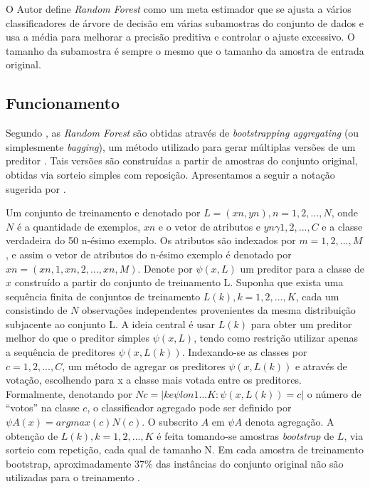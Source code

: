 O Autor \cite{scikitlearn} define \textit{Random Forest} como um meta estimador que se ajusta a vários classificadores de árvore de decisão em várias subamostras do conjunto de dados e usa a média para melhorar a precisão preditiva e controlar o ajuste excessivo. O tamanho da subamostra é sempre o mesmo que o tamanho da amostra de entrada original.

\subsection{Funcionamento}

Segundo \cite{bastos2013proposta}, as \textit{Random Forest} são obtidas através de \textit{bootstrapping aggregating} (ou simplesmente \textit{bagging}), um método utilizado para gerar múltiplas versões de um preditor \cite{breiman1996bagging}. Tais versões são construídas a partir de amostras do conjunto original, obtidas via sorteio simples com reposição. Apresentamos a seguir a notação sugerida por \cite{breiman2001random}. 

Um conjunto de treinamento e denotado por $ L = {(xn, yn), n = 1, 2,...,N} $, onde $ N $  é a quantidade de exemplos, $ xn $ e o vetor de atributos e $ yn \gamma {1, 2,...,C} $ e a classe verdadeira do 50 n-ésimo exemplo. Os atributos são indexados por $ m = 1, 2,...,M $, e assim o vetor de atributos do n-ésimo exemplo é denotado por  $ xn = (xn,1, xn,2,...,xn,M) $. Denote por $ \psi (x,L) $ um preditor para a classe de $ x $ construído a partir do conjunto de treinamento L. Suponha que exista uma sequência finita de conjuntos de treinamento $ {L(k) }, k = 1, 2,...,K $, cada um consistindo de $ N $ observações independentes provenientes da mesma distribuição subjacente ao conjunto L. A ideia central é usar $ {L(k) } $ para obter um preditor melhor do que o preditor simples $ \psi (x,L) $, tendo como restrição utilizar apenas a sequência de preditores $ \psi (x,L(k)) $. Indexando-se as classes por $ c = 1, 2,...,C $, um método de agregar os preditores $ \psi (x,L(k)) $ e através de votação, escolhendo para x a classe mais votada entre os preditores. Formalmente, denotando por $ Nc = |{k e\psi lon {1 ...K} : \psi (x,L(k) ) = c}| $ o número de “votos” na classe $ c $, o classificador agregado pode ser definido por $ \psi A(x) = arg max(c) N(c) $. O subscrito $ A $ em $ \psi A $ denota agregação. A obtenção de $ {L(k) }, k = 1, 2,...,K $ é feita tomando-se amostras \textit{bootstrap} de $ L $, via sorteio com repetição, cada qual de tamanho N. Em cada amostra de treinamento bootstrap, aproximadamente 37\% das instâncias do conjunto original  não são utilizadas para o treinamento \cite{breiman1996bagging}. 

